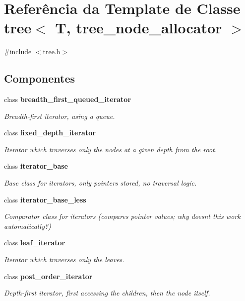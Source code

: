 \section{Referência da Template de Classe tree$<$ T, tree\+\_\+node\+\_\+allocator $>$}
\label{classtree}


{\ttfamily \#include $<$tree.\+h$>$}

\subsection*{Componentes}
\begin{DoxyCompactItemize}
\item 
class {\bf breadth\+\_\+first\+\_\+queued\+\_\+iterator}
\begin{DoxyCompactList}\small\item\em Breadth-\/first iterator, using a queue. \end{DoxyCompactList}\item 
class {\bf fixed\+\_\+depth\+\_\+iterator}
\begin{DoxyCompactList}\small\item\em Iterator which traverses only the nodes at a given depth from the root. \end{DoxyCompactList}\item 
class {\bf iterator\+\_\+base}
\begin{DoxyCompactList}\small\item\em Base class for iterators, only pointers stored, no traversal logic. \end{DoxyCompactList}\item 
class {\bf iterator\+\_\+base\+\_\+less}
\begin{DoxyCompactList}\small\item\em Comparator class for iterators (compares pointer values; why doesn\textquotesingle{}t this work automatically?) \end{DoxyCompactList}\item 
class {\bf leaf\+\_\+iterator}
\begin{DoxyCompactList}\small\item\em Iterator which traverses only the leaves. \end{DoxyCompactList}\item 
class {\bf post\+\_\+order\+\_\+iterator}
\begin{DoxyCompactList}\small\item\em Depth-\/first iterator, first accessing the children, then the node itself. \end{DoxyCompactList}\item 

\end{DoxyCompactItemize}
